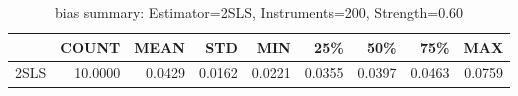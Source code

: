 \begin{table}[ht]
\centering
\caption{bias summary: Estimator=2SLS, Instruments=200, Strength=0.60}
\begin{tabular}{lrrrrrrrr}
\toprule
 & COUNT & MEAN & STD & MIN & 25\% & 50\% & 75\% & MAX \\
\midrule
2SLS & 10.0000 & 0.0429 & 0.0162 & 0.0221 & 0.0355 & 0.0397 & 0.0463 & 0.0759 \\
\bottomrule
\end{tabular}
\end{table}
